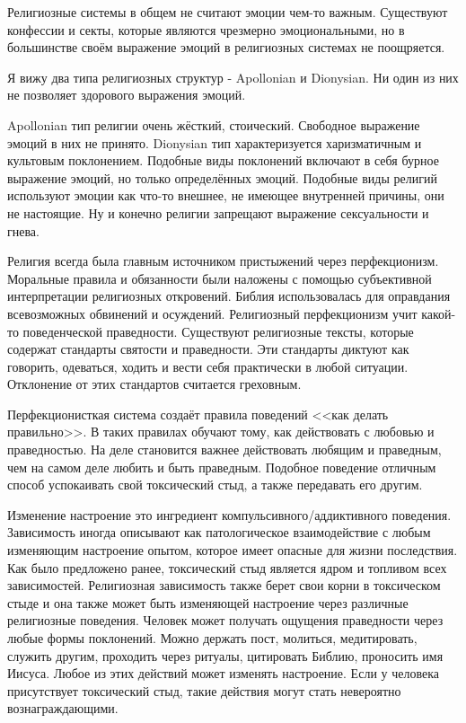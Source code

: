 \documentclass[10pt, fleqn]{article}
\begin{document}

Религиозные системы в общем не считают эмоции чем-то важным. Существуют конфессии и секты, которые являются чрезмерно эмоциональными, но в большинстве своём выражение эмоций в религиозных системах не поощряется.

Я вижу два типа религиозных структур - Apollonian и Dionysian. Ни один из них не позволяет здорового выражения эмоций.

Apollonian тип религии очень жёсткий, стоический. Свободное выражение эмоций в них не принято.
Dionysian тип характеризуется харизматичным и культовым поклонением. Подобные виды поклонений включают в себя бурное выражение эмоций, но только определённых эмоций. Подобные виды религий используют эмоции как что-то внешнее, не имеющее внутренней причины, они не настоящие.
Ну и конечно религии запрещают выражение сексуальности и гнева.


Религия всегда была главным источником пристыжений через перфекционизм. Моральные правила и обязанности были наложены с помощью субъективной интерпретации религиозных откровений. Библия использовалась для оправдания всевозможных обвинений и осуждений. Религиозный перфекционизм учит какой-то поведенческой праведности. Существуют религиозные тексты, которые содержат стандарты святости и праведности. Эти стандарты диктуют как говорить, одеваться, ходить и вести себя практически в любой ситуации. Отклонение от этих стандартов считается греховным.

Перфекционисткая система создаёт правила поведений <<как делать правильно>>. В таких правилах обучают тому, как действовать с любовью и праведностью. На деле становится важнее действовать любящим и праведным, чем на самом деле любить и быть праведным. Подобное поведение отличным способ успокаивать свой токсический стыд, а также передавать его другим.


Изменение настроение это ингредиент компульсивного/аддиктивного поведения. Зависимость иногда описывают как патологическое взаимодействие с любым изменяющим настроение опытом, которое имеет опасные для жизни последствия. Как было предложено ранее, токсический стыд является ядром и топливом всех зависимостей. Религиозная зависимость также берет свои корни в токсическом стыде и она также может быть изменяющей настроение через различные религиозные поведения. Человек может получать ощущения праведности через любые формы поклонений. Можно держать пост, молиться, медитировать, служить другим, проходить через ритуалы, цитировать Библию, проносить имя Иисуса. Любое из этих действий может изменять настроение. Если у человека присутствует токсический стыд, такие действия могут стать невероятно вознаграждающими.
\end{document}
